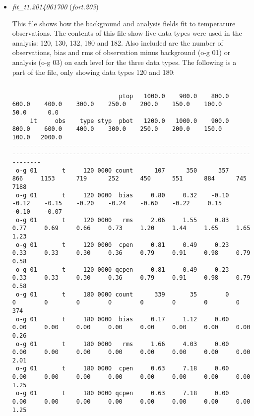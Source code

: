 \begin{itemize}[leftmargin=*]
\item \textit{fit\_t1.2014061700} (\textit{fort.203})

This file shows how the background and analysis fields fit to temperature observations.  The contents of this file show five data types were used in the analysis: 120, 130, 132, 180 and 182.  Also included are the number of observations, bias and rms of observation minus background (o-g 01) or analysis (o-g 03) on each level for the three data types.  The following is a part of the file, only showing data types 120 and 180:

\begin{tiny}
\begin{verbatim}

                              ptop   1000.0    900.0    800.0    600.0    400.0    300.0    250.0    200.0    150.0    100.0     50.0      0.0
     it     obs    type styp  pbot   1200.0   1000.0    900.0    800.0    600.0    400.0    300.0    250.0    200.0    150.0    100.0   2000.0
----------------------------------------------------------------------------------------------------------------------------------------------
 o-g 01       t     120 0000 count      107      350      357      866     1153      719      252      450      551      884      745     7188
 o-g 01       t     120 0000  bias     0.80     0.32    -0.10    -0.12    -0.15    -0.20    -0.24    -0.60    -0.22     0.15    -0.10    -0.07
 o-g 01       t     120 0000   rms     2.06     1.55     0.83     0.77     0.69     0.66     0.73     1.20     1.44     1.65     1.65     1.23
 o-g 01       t     120 0000  cpen     0.81     0.49     0.23     0.33     0.33     0.30     0.36     0.79     0.91     0.98     0.79     0.58
 o-g 01       t     120 0000 qcpen     0.81     0.49     0.23     0.33     0.33     0.30     0.36     0.79     0.91     0.98     0.79     0.58
 o-g 01       t     180 0000 count      339       35        0        0        0        0        0        0        0        0        0      374
 o-g 01       t     180 0000  bias     0.17     1.12     0.00     0.00     0.00     0.00     0.00     0.00     0.00     0.00     0.00     0.26
 o-g 01       t     180 0000   rms     1.66     4.03     0.00     0.00     0.00     0.00     0.00     0.00     0.00     0.00     0.00     2.01
 o-g 01       t     180 0000  cpen     0.63     7.18     0.00     0.00     0.00     0.00     0.00     0.00     0.00     0.00     0.00     1.25
 o-g 01       t     180 0000 qcpen     0.63     7.18     0.00     0.00     0.00     0.00     0.00     0.00     0.00     0.00     0.00     1.25

\end{verbatim}
\end{tiny}
\end{itemize}
